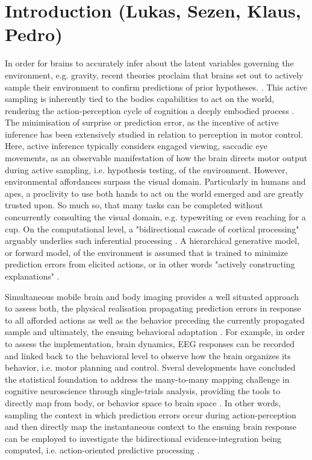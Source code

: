 \section{Introduction (Lukas, Sezen, Klaus, Pedro)}
In order for brains to accurately infer about the latent variables governing the environment, e.g. gravity, recent theories proclaim that brains set out to actively sample their environment to confirm predictions of prior hypotheses. \cites{Clark2013, Friston2010, Rao1999}. This active sampling is inherently tied to the bodies capabilities to act on the world, rendering the action-perception cycle of cognition a deeply embodied process \cite{Friston2012}. The minimisation of surprise or prediction error, as the incentive of active inference has been extensively studied in relation to perception in motor control. Here, active inference typically considers engaged viewing, saccadic eye movements, as an observable manifestation of how the brain directs motor output during active sampling, i.e. hypothesis testing, of the environment. However, environmental affordances surpass the visual domain. Particularly in humans and apes, a proclivity to use both hands to act on the world emerged and are greatly trusted upon. So much so, that many tasks can be completed without concurrently consulting the visual domain, e.g. typewriting or even reaching for a cup. On the computational level, a "bidirectional cascade of cortical processing" arguably underlies such inferential processing \cite{Clark2013}. A hierarchical generative model, or forward model, of the environment is assumed that is trained to minimize prediction errors from elicited actions, or in other words "actively constructing explanations" \cite{Wolpert2011, Friston2018}. 

Simultaneous mobile brain and body imaging provides a well situated approach to assess both, the physical realisation propagating prediction errors in response to all afforded actions as well as the behavior preceding the currently propagated sample and ultimately, the ensuing behavioral adaptation \cites{Gramann2014, Makeig2009}. For example, in order to assess the implementation, brain dynamics, EEG responses can be recorded and linked back to the behavioral level to observe how the brain organizes its behavior, i.e. motor planning and control. Sveral developments have concluded the statistical foundation to address the many-to-many mapping challenge in cognitive neuroscience through single-trials analysis, providing the tools to directly map from body, or behavior space to brain space \cites{Pernet2011, Bridwell2018, Friston1994a, Blankertz2011}. In other words, sampling the context in which prediction errors occur during action-perception and then directly map the instantaneous context to the ensuing brain response can be employed to investigate the bidirectional evidence-integration being computed, i.e. action-oriented predictive processing \cite{Clark2013}.